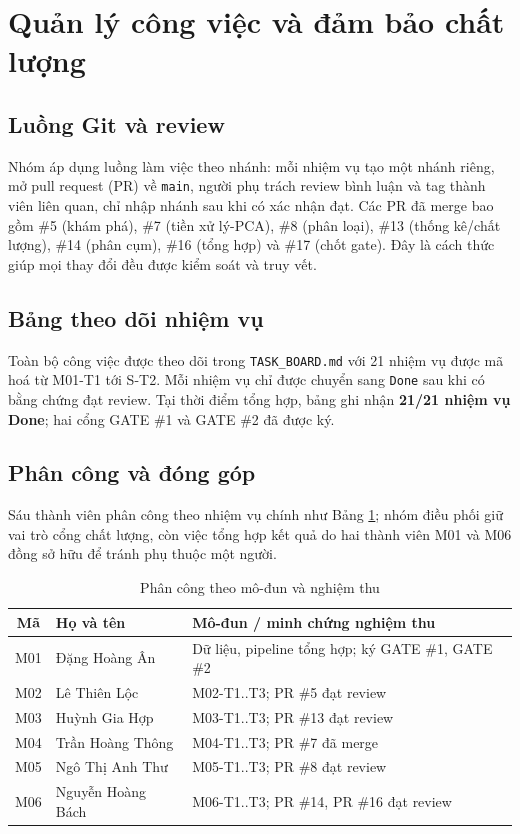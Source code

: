 \section{Quản lý công việc và đảm bảo chất lượng}

\subsection{Luồng Git và review}
Nhóm áp dụng luồng làm việc theo nhánh: mỗi nhiệm vụ tạo một nhánh riêng, mở pull request
(PR) về \texttt{main}, người phụ trách review bình luận và tag thành viên liên quan, chỉ
nhập nhánh sau khi có xác nhận đạt. Các PR đã merge bao gồm \#5 (khám phá), \#7 (tiền xử
lý-PCA), \#8 (phân loại), \#13 (thống kê/chất lượng), \#14 (phân cụm), \#16 (tổng hợp) và
\#17 (chốt gate). Đây là cách thức giúp mọi thay đổi đều được kiểm soát và truy vết.

\subsection{Bảng theo dõi nhiệm vụ}
Toàn bộ công việc được theo dõi trong \texttt{TASK\_BOARD.md} với 21 nhiệm vụ được mã hoá từ
M01-T1 tới S-T2. Mỗi nhiệm vụ chỉ được chuyển sang \texttt{Done} sau khi có bằng chứng đạt
review. Tại thời điểm tổng hợp, bảng ghi nhận \textbf{21/21 nhiệm vụ Done}; hai cổng GATE
\#1 và GATE \#2 đã được ký.

\subsection{Phân công và đóng góp}
Sáu thành viên phân công theo nhiệm vụ chính như Bảng \ref{tab:team_chap3}; nhóm điều phối
giữ vai trò cổng chất lượng, còn việc tổng hợp kết quả do hai thành viên M01 và M06 đồng sở
hữu để tránh phụ thuộc một người.

\begin{table}[H]
\centering
\caption{Phân công theo mô-đun và nghiệm thu}
\begin{tabular}{|c|l|l|}
\hline
\textbf{Mã} & \textbf{Họ và tên} & \textbf{Mô-đun / minh chứng nghiệm thu} \\
\hline
M01 & Đặng Hoàng Ân   & Dữ liệu, pipeline tổng hợp; ký GATE \#1, GATE \#2 \\
\hline
M02 & Lê Thiên Lộc    & M02-T1..T3; PR \#5 đạt review \\
\hline
M03 & Huỳnh Gia Hợp    & M03-T1..T3; PR \#13 đạt review \\
\hline
M04 & Trần Hoàng Thông & M04-T1..T3; PR \#7 đã merge \\
\hline
M05 & Ngô Thị Anh Thư   & M05-T1..T3; PR \#8 đạt review \\
\hline
M06 & Nguyễn Hoàng Bách & M06-T1..T3; PR \#14, PR \#16 đạt review \\
\hline
\end{tabular}
\label{tab:team_chap3}
\end{table}

